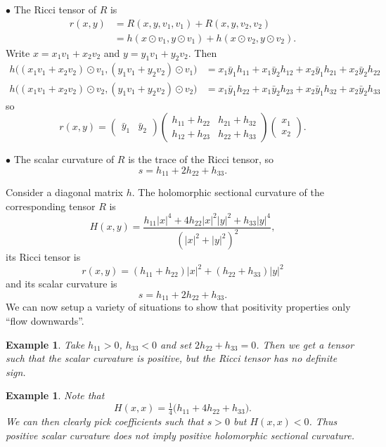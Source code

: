\documentclass[10pt,a4paper]{article}
\newtheorem{exam}[theo]{Example}
\begin{document}
\smallskip\noindent$\bullet$\quad
The Ricci tensor of $R$ is
\begin{align*}
  r(x,y)
  &= R(x,y,v_1,v_1) + R(x,y,v_2,v_2)
  \\
  &= h(x \odot v_1, y \odot v_1) + h(x \odot v_2, y \odot v_2).
\end{align*}
Write $x = x_1v_1 + x_2v_2$ and $y = y_1 v_1 + y_2v_2$. Then
\begin{align*}
h\bigl((x_1 v_1 + x_2v_2) \odot v_1, (y_1v_1 + y_2v_2) \odot v_1 \bigr)
&= x_1\bar y_1 h_{11} + x_1\bar y_2 h_{12} + x_2\bar y_1 h_{21} + x_2\bar y_2 h_{22}
\\
h\bigl((x_1 v_1 + x_2v_2) \odot v_2, (y_1v_1 + y_2v_2) \odot v_2 \bigr)
&= x_1\bar y_1 h_{22} + x_1\bar y_2 h_{23} + x_2\bar y_1 h_{32} + x_2\bar y_2 h_{33}
\end{align*}
so
$$
r(x,y)
= \begin{pmatrix}\bar y_1 & \bar y_2\end{pmatrix}
  \begin{pmatrix}
  h_{11} + h_{22}  & h_{21} + h_{32}
    \\
  h_{12} + h_{23} & h_{22} + h_{33}
  \end{pmatrix}
  \begin{pmatrix}x_1 \\ x_2 \end{pmatrix}.
$$


\smallskip\noindent$\bullet$\quad
The scalar curvature of $R$ is the trace of the Ricci tensor, so
$$
s = h_{11} + 2 h_{22} + h_{33}.
$$

\smallskip
Consider a diagonal matrix $h$. The holomorphic sectional curvature of the corresponding tensor $R$ is
$$
H(x,y)
= \frac{h_{11} |x|^4 + 4 h_{22} |x|^2|y|^2 + h_{33}|y|^4}{(|x|^2+|y|^2)^2},
$$
its Ricci tensor is
$$
r(x,y) = (h_{11} + h_{22})|x|^2 + (h_{22} + h_{33})|y|^2
$$
and its scalar curvature is
$$
s = h_{11} + 2h_{22} + h_{33}.
$$
We can now setup a variety of situations to show that positivity properties only ``flow downwards''.

\begin{exam}
Take $h_{11} > 0$, $h_{33} < 0$ and set $2h_{22} + h_{33} = 0$. Then we get a tensor such that the scalar curvature is positive, but the Ricci tensor has no definite sign.
\end{exam}

\begin{exam}
Note that
$$
H(x,x) = \tfrac 14 \bigl(h_{11} + 4h_{22} + h_{33} \bigr).
$$
We can then clearly pick coefficients such that $s > 0$ but $H(x,x) < 0$. Thus positive scalar curvature does not imply positive holomorphic sectional curvature.
\end{exam}
\end{document}
